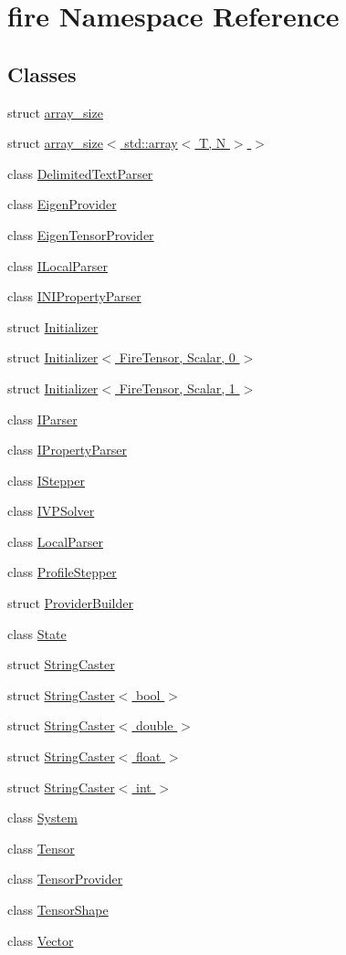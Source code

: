 \hypertarget{a00171}{}\section{fire Namespace Reference}
\label{a00171}
\subsection*{Classes}
\begin{DoxyCompactItemize}
\item 
struct \hyperlink{a00854}{array\+\_\+size}
\item 
struct \hyperlink{a00858}{array\+\_\+size$<$ std\+::array$<$ T, N $>$ $>$}
\item 
class \hyperlink{a00758}{Delimited\+Text\+Parser}
\item 
class \hyperlink{a00834}{Eigen\+Provider}
\item 
class \hyperlink{a00830}{Eigen\+Tensor\+Provider}
\item 
class \hyperlink{a00762}{I\+Local\+Parser}
\item 
class \hyperlink{a00766}{I\+N\+I\+Property\+Parser}
\item 
struct \hyperlink{a00862}{Initializer}
\item 
struct \hyperlink{a00870}{Initializer$<$ Fire\+Tensor, Scalar, 0 $>$}
\item 
struct \hyperlink{a00866}{Initializer$<$ Fire\+Tensor, Scalar, 1 $>$}
\item 
class \hyperlink{a00770}{I\+Parser}
\item 
class \hyperlink{a00774}{I\+Property\+Parser}
\item 
class \hyperlink{a00746}{I\+Stepper}
\item 
class \hyperlink{a00814}{I\+V\+P\+Solver}
\item 
class \hyperlink{a00778}{Local\+Parser}
\item 
class \hyperlink{a00750}{Profile\+Stepper}
\item 
struct \hyperlink{a00846}{Provider\+Builder}
\item 
class \hyperlink{a00818}{State}
\item 
struct \hyperlink{a00782}{String\+Caster}
\item 
struct \hyperlink{a00798}{String\+Caster$<$ bool $>$}
\item 
struct \hyperlink{a00786}{String\+Caster$<$ double $>$}
\item 
struct \hyperlink{a00790}{String\+Caster$<$ float $>$}
\item 
struct \hyperlink{a00794}{String\+Caster$<$ int $>$}
\item 
class \hyperlink{a00754}{System}
\item 
class \hyperlink{a00838}{Tensor}
\item 
class \hyperlink{a00842}{Tensor\+Provider}
\item 
class \hyperlink{a00850}{Tensor\+Shape}
\item 
class \hyperlink{a00826}{Vector}
\end{DoxyCompactItemize}
